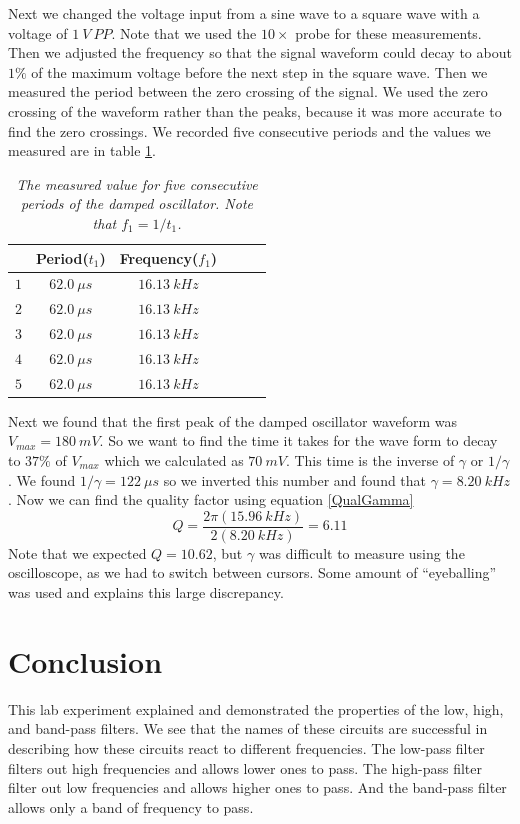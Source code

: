 \documentclass[11pt]{article}
\numberwithin{equation}{section}
\numberwithin{figure}{section}
\numberwithin{table}{section}
\begin{document}
Next we changed the voltage input from a sine wave to a square wave with a voltage of $1\ V\ PP$. Note that we used the $10\times$ probe for these measurements. Then we adjusted the frequency so that the signal waveform could decay to about $1\%$ of the maximum voltage before the next step in the square wave. Then we measured the period between the zero crossing of the signal. We used the zero crossing of the waveform rather than the peaks, because it was more accurate to find the zero crossings. We recorded five consecutive periods and the values we measured are in table \ref{BandPassPeriod}.
\begin{table}[h]
\centering
\begin{tabular}{lccccc}
	&Period($t_1$)		&Frequency($f_1$)\\
\hline
$1$	&$62.0\ \mu s$		&$16.13\ kHz$\\
$2$	&$62.0\ \mu s$		&$16.13\ kHz$\\
$3$	&$62.0\ \mu s$		&$16.13\ kHz$\\
$4$	&$62.0\ \mu s$		&$16.13\ kHz$\\
$5$	&$62.0\ \mu s$		&$16.13\ kHz$\\
\end{tabular}
\caption{\textit{The measured value for five consecutive periods of the damped oscillator. Note that $f_1=1/t_1$.}}
\label{BandPassPeriod}
\end{table}

Next we found that the first peak of the damped oscillator waveform was $V_{max}=180\ mV$. So we want to find the time it takes for the wave form to decay to $37\%$ of $V_{max}$ which we calculated as $70\ mV$. This time is the inverse of $\gamma$ or $1/\gamma$. We found $1/\gamma =122\ \mu s$ so we inverted this number and found that $\gamma = 8.20\ kHz$. Now we can find the quality factor using equation \ref{QualGamma}
$$Q = \frac{2\pi(15.96\ kHz)}{2(8.20\ kHz)} = 6.11$$
Note that we expected $Q=10.62$, but $\gamma$ was difficult to measure using the oscilloscope, as we had to switch between cursors. Some amount of ``eyeballing'' was used and explains this large discrepancy.

\section{Conclusion}
This lab experiment explained and demonstrated the properties of the low, high, and band-pass filters. We see that the names of these circuits are successful in describing how these circuits react to different frequencies. The low-pass filter filters out high frequencies and allows lower ones to pass. The high-pass filter filter out low frequencies and allows higher ones to pass. And the band-pass filter allows only a band of frequency to pass.
\end{document}
